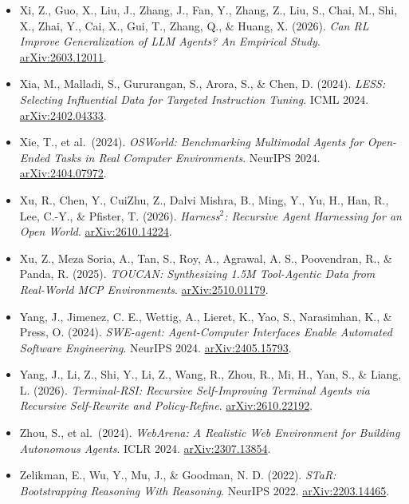 \documentclass[
  10pt,
]{article}
\begin{document}
\begin{itemize}
  Wu, Z., Mao, R., Tian, Z., Cheng, P., Ju, T., Wu, Z., Dong, L., Sheng,
  H., Zhang, Z., \& Liu, G. (2026). \emph{See, Think, Act: Teaching
  Multimodal Agents to Effectively Interact with GUI by Identifying
  Toggles}. CVPR 2026.
  \href{https://arxiv.org/abs/2509.13615}{arXiv:2509.13615}.
\item
  Xi, Z., Guo, X., Liu, J., Zhang, J., Fan, Y., Zhang, Z., Liu, S.,
  Chai, M., Shi, X., Zhai, Y., Cai, X., Gui, T., Zhang, Q., \& Huang, X.
  (2026). \emph{Can RL Improve Generalization of LLM Agents? An
  Empirical Study}.
  \href{https://arxiv.org/abs/2603.12011}{arXiv:2603.12011}.
\item
  Xia, M., Malladi, S., Gururangan, S., Arora, S., \& Chen, D. (2024).
  \emph{LESS: Selecting Influential Data for Targeted Instruction
  Tuning}. ICML 2024.
  \href{https://arxiv.org/abs/2402.04333}{arXiv:2402.04333}.
\item
  Xie, T., et al.~(2024). \emph{OSWorld: Benchmarking Multimodal Agents
  for Open-Ended Tasks in Real Computer Environments}. NeurIPS 2024.
  \href{https://arxiv.org/abs/2404.07972}{arXiv:2404.07972}.
\item
  Xu, R., Chen, Y., CuiZhu, Z., Dalvi Mishra, B., Ming, Y., Yu, H., Han,
  R., Lee, C.-Y., \& Pfister, T. (2026). \emph{Harness\(^2\): Recursive
  Agent Harnessing for an Open World}.
  \href{https://arxiv.org/abs/2610.14224}{arXiv:2610.14224}.
\item
  Xu, Z., Meza Soria, A., Tan, S., Roy, A., Agrawal, A. S., Poovendran,
  R., \& Panda, R. (2025). \emph{TOUCAN: Synthesizing 1.5M Tool-Agentic
  Data from Real-World MCP Environments}.
  \href{https://arxiv.org/abs/2510.01179}{arXiv:2510.01179}.
\item
  Yang, J., Jimenez, C. E., Wettig, A., Lieret, K., Yao, S., Narasimhan,
  K., \& Press, O. (2024). \emph{SWE-agent: Agent-Computer Interfaces
  Enable Automated Software Engineering}. NeurIPS 2024.
  \href{https://arxiv.org/abs/2405.15793}{arXiv:2405.15793}.
\item
  Yang, J., Li, Z., Shi, Y., Li, Z., Wang, R., Zhou, R., Mi, H., Yan,
  S., \& Liang, L. (2026). \emph{Terminal-RSI: Recursive Self-Improving
  Terminal Agents via Recursive Self-Rewrite and Policy-Refine}.
  \href{https://arxiv.org/abs/2610.22192}{arXiv:2610.22192}.
\item
  Zhou, S., et al.~(2024). \emph{WebArena: A Realistic Web Environment
  for Building Autonomous Agents}. ICLR 2024.
  \href{https://arxiv.org/abs/2307.13854}{arXiv:2307.13854}.
\item
  Zelikman, E., Wu, Y., Mu, J., \& Goodman, N. D. (2022). \emph{STaR:
  Bootstrapping Reasoning With Reasoning}. NeurIPS 2022.
  \href{https://arxiv.org/abs/2203.14465}{arXiv:2203.14465}.
\end{itemize}
\end{document}
